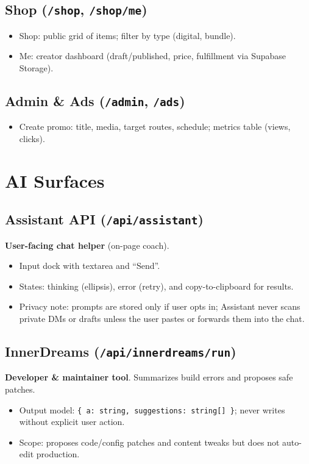 \documentclass[11pt]{article}
\begin{document}
\subsection{Shop (\texttt{/shop}, \texttt{/shop/me})}
\begin{itemize}
  \item Shop: public grid of items; filter by type (digital, bundle).
  \item Me: creator dashboard (draft/published, price, fulfillment via Supabase Storage).
\end{itemize}

\subsection{Admin \& Ads (\texttt{/admin}, \texttt{/ads})}
\begin{itemize}
  \item Create promo: title, media, target routes, schedule; metrics table (views, clicks).
\end{itemize}

\section{AI Surfaces}

\subsection{Assistant API (\texttt{/api/assistant})}
\textbf{User-facing chat helper} (on-page coach).
\begin{itemize}
  \item Input dock with textarea and ``Send''.
  \item States: thinking (ellipsis), error (retry), and copy-to-clipboard for results.
  \item Privacy note: prompts are stored only if user opts in; Assistant never scans private DMs or drafts unless the user pastes or forwards them into the chat.
\end{itemize}

\subsection{InnerDreams (\texttt{/api/innerdreams/run})}
\textbf{Developer \& maintainer tool}. Summarizes build errors and proposes safe patches.
\begin{itemize}
  \item Output model: \texttt{\{ a: string, suggestions: string[] \}}; never writes without explicit user action.
  \item Scope: proposes code/config patches and content tweaks but does not auto-edit production.
\end{itemize}
\end{document}
